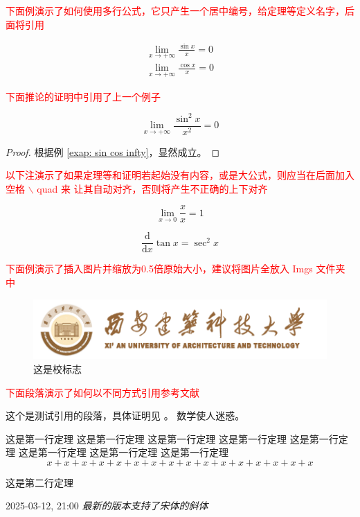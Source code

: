 \textcolor{red}{下面例演示了如何使用多行公式，它只产生一个居中编号，给定理等定义名字，后面将引用}
\begin{example}\label{exap: sin cos infty}
    \begin{equation}
        \begin{aligned}
            \lim_{x\to +\infty} \frac{\sin x}{x} = 0 \\
            \lim_{x\to +\infty} \frac{\cos x}{x} = 0
        \end{aligned}
    \end{equation}
\end{example}

\textcolor{red}{下面推论的证明中引用了上一个例子}
\begin{corollary}
    \[
        \lim_{x\to +\infty} \frac{\sin^2 x}{x^2} = 0
    \]

    \begin{proof}
        根据例 \ref{exap: sin cos infty}，显然成立。
    \end{proof}
\end{corollary}

\textcolor{red}{以下注演示了如果定理等和证明若起始没有内容，或是大公式，则应当在后面加入空格 $\backslash$ quad 来 让其自动对齐，否则将产生不正确的上下对齐}
\begin{remark} \quad
    \[
        \lim_{x\to 0} \frac{x}{x} = 1
    \]
\end{remark}

\begin{equation}
    \frac{\mathrm{d}}{\mathrm{d}x} \tan x = \sec^2 x
\end{equation}

\textcolor{red}{下面例演示了插入图片并缩放为0.5倍原始大小，建议将图片全放入 Imgs 文件夹中}

\begin{figure}[h]
    \centering
    \includegraphics[scale=0.5]{Imgs/xiaoming.png}
    \caption{这是校标志}
\end{figure}

\textcolor{red}{下面段落演示了如何以不同方式引用参考文献}

这个是测试引用的段落\cite{Ibrahim2022}，具体证明见 \cite[定理 8]{SB2077}。
数学使人迷惑\supercite{SB2077}。

\begin{theorem}
    这是第一行定理
    这是第一行定理
    这是第一行定理
    这是第一行定理
    这是第一行定理
    这是第一行定理
    这是第一行定理
    这是第一行定理
    \[
        x + x + x + x +
        x + x + x + x +
        x + x + x + x +
        x + x + x + x
    \]
\end{theorem}

\begin{theorem}
    这是第二行定理
\end{theorem}

2025-03-12, 21:00
\textit{最新的版本支持了宋体的斜体}


